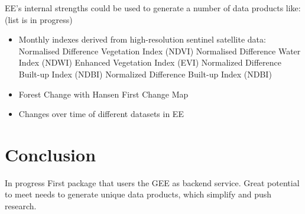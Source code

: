 EE's internal strengths could be used to generate a number of data products like: (list is in progress)

\begin{itemize}
	\item Monthly indexes derived from high-resolution sentinel satellite data: 
	\subitem Normalised Difference Vegetation Index (NDVI)
	\subitem Normalised Difference Water Index (NDWI)
	\subitem Enhanced Vegetation Index (EVI)
	\subitem  Normalized Difference Built-up Index (NDBI)
	\subitem  Normalized Difference Built-up Index (NDBI)
	\item Forest Change with Hansen First Change Map
	\item Changes over time of different datasets in EE
\end{itemize}



\chapter{Conclusion}


In progress
First package that users the GEE as backend service.
Great potential to meet needs to generate unique data products, which simplify and push research.






